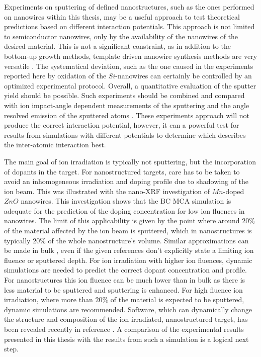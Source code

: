 Experiments on sputtering of defined nanostructures, such as the ones performed on nanowires within this thesis, may be a useful approach to test theoretical predictions based on different interaction potentials. This approach is not limited to semiconductor nanowires, only by the availability of the nanowires of the desired material. This is not a significant constraint, as in addition to the bottom-up growth methods, template driven nanowire synthesis methods are very versatile \cite{martin_membrane-based_1996}. The systematical deviation, such as the one caused in the experiments reported here by oxidation of the $Si$-nanowires can certainly be controlled by an optimized experimental protocol. Overall, a quantitative evaluation of the sputter yield should be possible. Such experiments should be combined and compared with ion impact-angle dependent measurements of the sputtering \cite{hofsass_simulation_2014} and the angle resolved emission of the sputtered atoms \cite{wirtz_storing_2008,verdeil_angular_2008}. These experiments approach will not produce the correct interaction potential, however, it can a powerful test for results from simulations with different potentials to determine which describes the inter-atomic interaction best.

The main goal of ion irradiation is typically not sputtering, but the incorporation of dopants in the target. For nanostructured targets, care has to be taken to avoid an inhomogeneous irradiation and doping profile due to shadowing of the ion beam. This was illustrated with the nano-XRF investigation of $Mn$-doped $ZnO$ nanowires. This investigation shows that the BC MCA simulation is adequate for the prediction of the doping concentration for low ion fluences in nanowires. The limit of this applicability is given by the point where around $20\%$ of the material affected by the ion beam is sputtered, which in nanostructures is typically $20\%$ of the whole nanostructure's volume. Similar approximations can be made in bulk \cite{moller_tridyn_1984,andersen_computer_1986,moller_tridyn-binary_1988,sigmund_alloy_1993,zaporozchenko_preferential_1995}, even if the given references don't explicitly state a limiting ion fluence or sputtered depth. For ion irradiation with higher ion fluences, dynamic simulations are needed to predict the correct dopant concentration and profile. For nanostructures this ion fluence can be much lower than in bulk as there is less material to be sputtered and sputtering is enhanced. For high fluence ion irradiation, where more than $20\%$ of the material is expected to be sputtered, dynamic simulations are recommended. Software, which can dynamically change the structure and composition of the ion irradiated, nanostructured target, has been revealed recently in reference \cite{moller_tri3dyn_2014}. A comparison of the experimental results presented in this thesis with the results from such a simulation is a logical next step.

